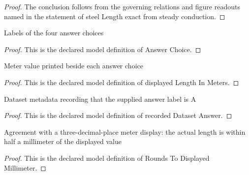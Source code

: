 \begin{proof}
  The conclusion follows from the governing relations and figure readouts named in the statement of steel Length exact from steady conduction.
\end{proof}
\begin{definition}
  \label{def:physics:phyx-mini-0331:phyxminiproblems-problemphyxmini0331-answerchoice}
  Labels of the four answer choices
\end{definition}
\begin{proof}
  This is the declared model definition of Answer Choice.
\end{proof}
\begin{definition}
  \label{def:physics:phyx-mini-0331:phyxminiproblems-problemphyxmini0331-displayedlengthinmeters}
  Meter value printed beside each answer choice
\end{definition}
\begin{proof}
  This is the declared model definition of displayed Length In Meters.
\end{proof}
\begin{definition}
  \label{def:physics:phyx-mini-0331:phyxminiproblems-problemphyxmini0331-recordeddatasetanswer}
  Dataset metadata recording that the supplied answer label is A
\end{definition}
\begin{proof}
  This is the declared model definition of recorded Dataset Answer.
\end{proof}
\begin{definition}
  \label{def:physics:phyx-mini-0331:phyxminiproblems-problemphyxmini0331-roundstodisplayedmillimeter}
  Agreement with a three-decimal-place meter display: the actual length is within half a millimeter of the displayed value
\end{definition}
\begin{proof}
  This is the declared model definition of Rounds To Displayed Millimeter.
\end{proof}
